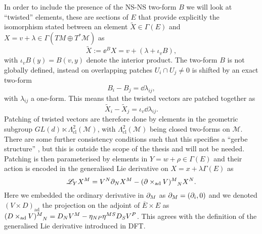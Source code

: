 In order to include the presence of the NS-NS two-form $B$ we will look at ``twisted'' elements, these are sections of $E$ that provide explicitly the isomorphism stated between an element $\tilde{X}\in\Gamma(E)$ and $X=v+\lambda\in\Gamma(TM\oplus T^*\mathcal{M})$ as
\begin{equation}
    \tilde{X} := \ee^{B}X = v+\left(\lambda+\iota_v B\right),
\end{equation}
with $\iota_vB(y)=B(v,y)$ denote the interior product. The two-form $B$ is not globally defined, instead on overlapping patches $U_i\cap U_j\neq 0$ is shifted by an exact two-form
\begin{equation}
    B_i-B_j = \dd \lambda_{ij},
\end{equation}
with $\lambda_{ij}$ a one-form. This means that the twisted vectors are patched together as 
\begin{equation}
    \tilde{X}_i-\tilde{X}_j = \iota_v\dd \lambda_{ij}. 
\end{equation}
Patching of twisted vectors are therefore done by elements in the geometric subgroup $GL(d)\ltimes \Lambda^2_{\text{cl}}(\mathcal{M})$, with $\Lambda^2_{\text{cl}}(\mathcal{M})$ being closed two-forms on $\mathcal{M}$. There are some further consistency conditions such that this specifies a ``gerbe structure'' \cite{Hitchin:1999fh}, but this is outside the scope of the thesis and will not be needed. 
Patching is then parameterised by elements in $Y=w+\rho\in\Gamma(E)$ and their action is encoded in the generalised Lie derivative on $X=x+\lambda\Gamma(E)$ as 
\begin{equation}
    \mathscr{L}_YX^M = V^N\pd_NX^M-(\pd\times_{\text{ad}} V)\tensor{}{^M_N} X^N.
\end{equation}
Here we embedded the ordinary derivative in $\partial_M$ as $\partial_M=(\partial_i,0)$ and we denoted $(V\times D)_{\text{ad}}$ the projection on the adjoint of $\overbar{E}\times E$ as  $(D\times_{\text{ad}} V)\tensor{}{^M_N}=D_NV^M-\eta_{NP}\eta^{MS}D_SV^P$. This agrees with the definition of the generalised Lie derivative introduced in DFT.


